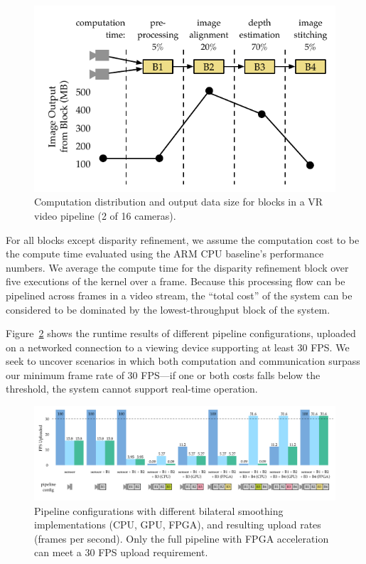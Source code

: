\begin{figure}
\centering
    \begin{center}
\includegraphics[width=\textwidth]{nsp-figs/vr_input_data.pdf}
    \end{center}
    \caption{Computation distribution and output data size for blocks in a VR video pipeline (2 of 16 cameras). }
    \label{fig:vr-data-scale}
\end{figure}

For all blocks except disparity refinement, we assume the computation cost to be the compute time evaluated using the ARM CPU baseline's performance numbers. We average the compute time for the disparity refinement block over five executions of the kernel over a frame. Because this processing flow can be pipelined across frames in a video stream, the ``total cost'' of the system can be considered to be dominated by the lowest-throughput block of the system.

Figure~\ref{fig:vr-fps} shows the runtime results of different pipeline configurations, uploaded on a networked connection to a viewing device supporting at least 30 FPS. We seek to uncover scenarios in which both computation and communication surpass our minimum frame rate of 30 FPS---if one or both costs falls below the threshold, the system cannot support real-time operation.

\begin{figure}[h]
\centering
    \begin{center}
\includegraphics[width=1.0\textwidth]{nsp-figs/vr_compute_transfer.pdf}
    \end{center}
    \caption{Pipeline configurations with different bilateral smoothing implementations (CPU, GPU, FPGA), and resulting upload rates (frames per second). Only the full pipeline with FPGA acceleration can meet a 30 FPS upload requirement.}
    \label{fig:vr-fps}
\end{figure}



